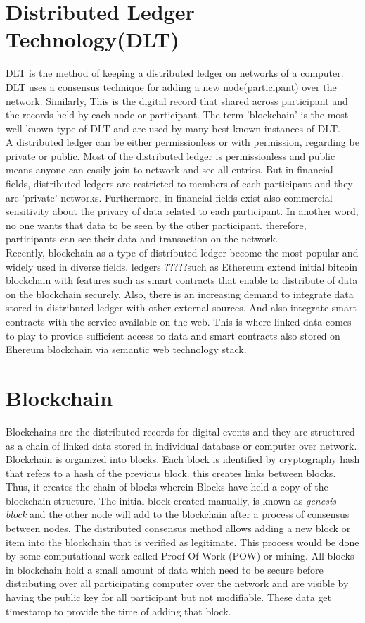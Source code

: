 \section{Distributed Ledger Technology(DLT)}
DLT is the method of keeping a distributed ledger on networks of a computer. DLT uses a consensus technique for adding a new node(participant) over the network. Similarly, This is the digital record that shared across participant and the records held by each node or participant. The term 'blockchain' is the most well-known type of DLT and are used by many best-known instances of DLT.\\
A distributed ledger can be either permissionless or with permission, regarding be private or public. 
Most of the distributed ledger is permissionless and public means anyone can easily join to network and see all entries. But in financial fields, distributed ledgers are restricted to members of each participant and they are 'private' networks. Furthermore, in financial fields exist also commercial sensitivity about the privacy of data related to each participant. In another word, no one wants that data to be seen by the other participant. therefore, participants can see their data and transaction on the network.\\
Recently, blockchain as a type of distributed ledger become the most popular and widely used in diverse fields. ledgers ?????such as Ethereum extend initial bitcoin blockchain with features such as smart contracts that enable to distribute of data on the blockchain securely.
Also, there is an increasing demand to integrate data stored in distributed ledger with other external sources. And also integrate smart contracts with the service available on the web. This is where linked data comes to play to provide sufficient access to data and smart contracts also stored on Ehereum blockchain via semantic web technology stack\cite{Third}.

\section{Blockchain}
Blockchains are the distributed records for digital events and they are structured as a chain of linked data stored in individual database or computer over network\cite{Third}.
Blockchain is organized into blocks. Each block is identified by cryptography hash that refers to a hash of the previous block. this creates links between blocks. Thus, it creates the chain of blocks wherein Blocks have held a copy of the blockchain structure. The initial block created manually, is known as \textit {genesis block} and the other node will add to the blockchain after a process of consensus between nodes. The distributed consensus method allows adding a new block or item into the blockchain that is verified as legitimate. This process would be done by some computational work called Proof Of Work (POW) or mining.
All blocks in blockchain hold a small amount of data which need to be secure before distributing over all participating computer over the network and are visible by having the public key for all participant but not modifiable. These data get timestamp to provide the time of adding that block.

